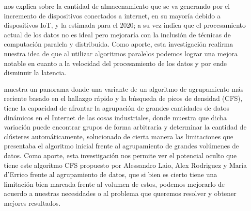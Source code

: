         \vskip 0.3cm
        {\cite{piccialli2018}} nos explica sobre la cantidad de almacenamiento que se va generando por el incremento de dispositivos conectados a internet, en su mayoría debido a dispositivos IoT, y la estimada para el 2020; a su vez indica que el procesamiento actual de los datos no es ideal pero mejoraría con la inclusión de técnicas de computación paralela y distribuida. Como aporte, esta investigación reafirma nuestra idea de que al utilizar algoritmos paralelos podemos lograr una mejora notable en cuanto a la velocidad del procesamiento de los datos y por ende disminuir la latencia. \par
        \vskip 0.3cm
        {\cite{shanmugapriya2018}} muestra un panorama donde una variante de un algoritmo de agrupamiento más reciente basado en el hallazgo rápido y la búsqueda de picos de densidad (CFS), tiene la capacidad de afrontar la agrupación de grandes cantidades de datos dinámicos en el Internet de las cosas industriales, donde muestra que dicha variación puede encontrar grupos de forma arbitraria y determinar la cantidad de clústeres automáticamente, solucionado de cierta manera las limitaciones que presentaba el algoritmo inicial frente al agrupamiento de grandes volúmenes de datos. Como aporte, esta investigación nos permite ver el potencial oculto que tiene este algoritmo CFS propuesto por Alessandro Laio, Alex Rodriguez y Maria d’Errico frente al agrupamiento de datos, que si bien es cierto tiene una limitación bien marcada frente al volumen de estos, podemos mejorarlo de acuerdo a nuestras necesidades o al problema que queremos resolver y obtener mejores resultados.\par

